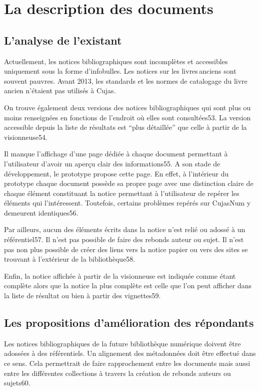 \section{La description des documents}

\subsection{L’analyse de l’existant}

Actuellement, les notices bibliographiques sont incomplètes et accessibles uniquement sous la forme d’infobulles.  Les notices sur les livres anciens sont souvent pauvres. Avant 2013, les standards et les normes de catalogage du livre ancien n’étaient pas utilisés à Cujas.  

On trouve également deux versions des notices bibliographiques qui sont plus ou moins renseignées en fonctions de l’endroit où elles sont consultées53. La version accessible depuis la liste de résultats est \enquote{plus détaillée} que celle à partir de la visionneuse54.  

Il manque l’affichage d’une page dédiée à chaque document permettant à l’utilisateur d’avoir un aperçu clair des informations55. A son stade de développement, le prototype propose cette page. En effet, à l’intérieur du prototype chaque document possède sa propre page avec une distinction claire de chaque élément constituant la notice permettant à l’utilisateur de repérer les éléments qui l’intéressent. Toutefois, certains problèmes repérés sur CujasNum y demeurent identiques56.  

Par ailleurs, aucun des éléments écrits dans la notice n’est relié ou adossé à un référentiel57. Il n’est pas possible de faire des rebonds auteur ou sujet. Il n’est pas non plus possible de créer des liens vers la notice papier ou vers des sites se trouvant à l’extérieur de la bibliothèque58.  

Enfin, la notice affichée à partir de la visionneuse est indiquée comme étant complète alors que la notice la plus complète est celle que l’on peut afficher dans la liste de résultat ou bien à partir des vignettes59.  

\subsection{Les propositions d’amélioration des répondants} 

Les notices bibliographiques de la future bibliothèque numérique doivent être adossées à des référentiels. Un alignement des métadonnées doit être effectué dans ce sens. Cela permettrait de faire rapprochement entre les documents mais aussi entre les différentes collections à travers la création de rebonds auteurs ou sujets60.  

